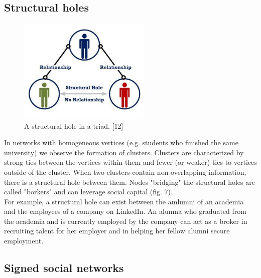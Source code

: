 \documentclass[conference,letterpaper]{IEEEtran}
\begin{document}
\subsection{Structural holes}
\begin{center}
\begin{figure}[hb]
\centering
\includegraphics[width=2.5in]{structural_hole}
\caption{
A structural hole in a triad. [12]
}
\label{fig_sim7}
\end{figure}
\end{center}
In networks with homogeneous vertices (e.g. students who finished the same university) we observe the
formation of clusters. Clusters are characterized by strong ties between the vertices within them and fewer
(or weaker) ties to vertices outside of the cluster. When two clusters contain non-overlapping information,
there is a structural hole between them. Nodes "bridging" the structural holes are called "borkers" and can
leverage social capital (fig. 7). \\
For example, a structural hole can exist between the amlumni of an academia and the employees of a company
on LinkedIn. An alumna who graduated from the academia and is currently employed by the company can act as
a broker in recruiting talent for her employer and in helping her fellow alumni secure employment.\\

\subsection{Signed social networks}
\end{document}
